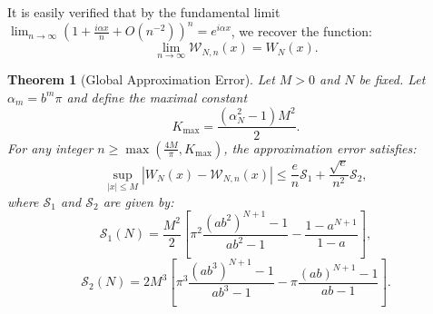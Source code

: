 \documentclass[reqno,11pt]{amsart}
\newtheorem{theorem}{Theorem}[section]
\theoremstyle{definition}
\begin{document}
It is easily verified that by the fundamental limit $\lim_{n \to \infty} (1 + \frac{i \alpha x}{n} + O(n^{-2}))^n = e^{i \alpha x}$, we recover the  function:
\begin{equation} \label{eq:super_weierstrassLIM}
    \lim_{n \to \infty} \mathcal{W}_{N, n}(x) = W_N(x).
\end{equation}

\begin{theorem}[Global Approximation Error]
Let $M > 0$ and $N$ be fixed. Let $\alpha_m = b^m \pi$ and define the maximal constant
$$K_{\max} = \frac{(\alpha_N^2 - 1)M^2}{2}.
$$
For any integer $n \ge \max\left( \frac{4M}{\pi}, K_{\max} \right)$,
the approximation error satisfies:
\begin{equation}
    \sup_{|x|\leq M} |W_N(x) - \mathcal{W}_{N,n}(x)| \leq \frac{e}{n} \mathcal{S}_1 + \frac{\sqrt{e}}{n^2} \mathcal{S}_2,
\end{equation}
where $\mathcal{S}_1$ and $\mathcal{S}_2$ are given by:
\begin{equation}\label{esse1}
    \mathcal{S}_1(N) = \frac{M^2}{2} \left[ \pi^2 \frac{(ab^2)^{N+1}-1}{ab^2-1} - \frac{1-a^{N+1}}{1-a} \right],
\end{equation}
\begin{equation}\label{esse2}
    \mathcal{S}_2(N) = 2M^3 \left[ \pi^3 \frac{(ab^3)^{N+1}-1}{ab^3-1} - \pi \frac{(ab)^{N+1}-1}{ab-1} \right].
\end{equation}
\end{theorem}
\end{document}
